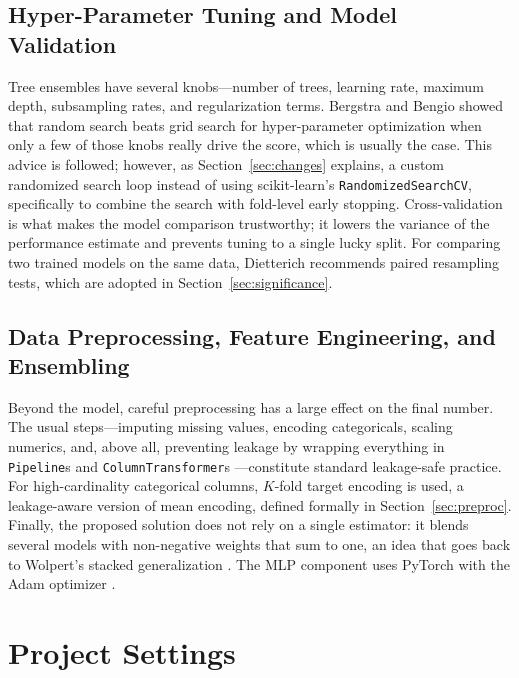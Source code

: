 \documentclass[journal]{IEEEtran}
\begin{document}
\subsection{Hyper-Parameter Tuning and Model Validation}
Tree ensembles have several knobs---number of trees, learning rate, maximum
depth, subsampling rates, and regularization terms. Bergstra and Bengio
\cite{bergstra2012random} showed that random search beats grid search for
hyper-parameter optimization when only a few of those knobs really drive the
score, which is usually the case. This advice is followed; however, as
Section~\ref{sec:changes} explains, a custom randomized
search loop instead of using scikit-learn's \texttt{RandomizedSearchCV},
specifically to combine the search with fold-level early stopping.
Cross-validation is what makes the model comparison trustworthy; it
lowers the variance of the performance estimate and prevents tuning to a
single lucky split. For comparing two trained models on the same data,
Dietterich \cite{dietterich1998} recommends paired resampling tests, which are
adopted in Section~\ref{sec:significance}.

\subsection{Data Preprocessing, Feature Engineering, and Ensembling}
Beyond the model, careful preprocessing has a large effect on the final number.
The usual steps---imputing missing values, encoding categoricals, scaling
numerics, and, above all, preventing leakage by wrapping everything in
\texttt{Pipeline}s and \texttt{ColumnTransformer}s
\cite{pedregosa2011sklearn}---constitute standard leakage-safe practice. For
high-cardinality categorical columns, $K$-fold target encoding is used, a
leakage-aware version of mean encoding, defined formally in
Section~\ref{sec:preproc}. Finally, the proposed solution does not rely on a
single estimator: it blends several models with non-negative weights that sum to
one, an idea that goes back to Wolpert's stacked generalization
\cite{wolpert1992stacked}. The MLP component uses PyTorch \cite{paszke2019pytorch}
with the Adam optimizer \cite{kingma2015adam}.

\section{Project Settings}
\label{sec:settings}
\end{document}
